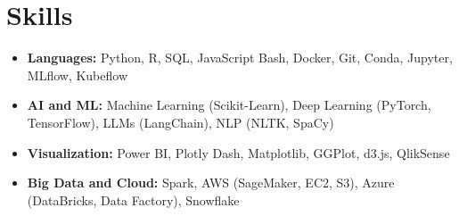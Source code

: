 \documentclass[letterpaper,11pt]{article}
\begin{document}
\section{\Large{Skills}}
\vspace{3pt}
\begin{itemize}[leftmargin=0.00in, label={}, itemsep=0pt, parsep=0pt]
    \item{
        \small{\textbf{Languages:}}
        \small{Python, R, SQL, JavaScript} 
        \hspace{0.7cm}
        {\fontsize{10.2pt}{13pt}\selectfont{Tools:}}
        \small{Bash, Docker, Git, Conda, Jupyter, MLflow, Kubeflow}
        }




    \item{
        \small{\textbf{AI and ML:}}
        \small{Machine Learning (Scikit-Learn), Deep Learning (PyTorch, TensorFlow), LLMs (LangChain), NLP (NLTK, SpaCy)}
        }

    \item{
        \small{\textbf{Visualization:}}
        \small{Power BI, Plotly Dash, Matplotlib, GGPlot, d3.js, QlikSense}
        }
        
    \item{
        \small{\textbf{Big Data and Cloud:}}
        \small{Spark, AWS (SageMaker, EC2, S3), Azure (DataBricks, Data Factory), Snowflake}
        }

    
\end{itemize}
\end{document}
